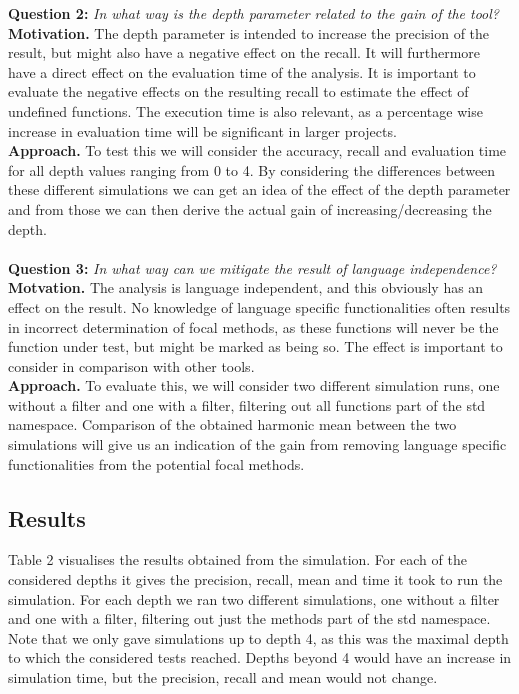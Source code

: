 \documentclass[11pt]{article}
\begin{document}
\begin{multicols}{2}
\noindent
\textbf{Question 2:} \textit{In what way is the depth parameter related to the gain of the tool?}\\
\textbf{Motivation.} The depth parameter is intended to increase the precision of the result, but might also have a negative effect on the recall. It will furthermore have a direct effect on the evaluation time of the analysis. It is important to evaluate the negative effects on the resulting recall to estimate the effect of undefined functions. The execution time is also relevant, as a percentage wise increase in evaluation time will be significant in larger projects.\\
\textbf{Approach.} To test this we will consider the accuracy, recall and evaluation time for all depth values ranging from 0 to 4. By considering the differences between these different simulations we can get an idea of the effect of the depth parameter and from those we can then derive the actual gain of increasing/decreasing the depth. \\
\\
\noindent
\textbf{Question 3:} \textit{In what way can we mitigate the result of language independence?}\\
\textbf{Motvation.} The analysis is language independent, and this obviously has an effect on the result. No knowledge of language specific functionalities often results in incorrect determination of focal methods, as these functions will never be the function under test, but might be marked as being so. The effect is important to consider in comparison with other tools. \\
\textbf{Approach.} To evaluate this, we will consider two different simulation runs, one without a filter and one with a filter, filtering out all functions part of the std namespace. Comparison of the obtained harmonic mean between the two simulations will give us an indication of the gain from removing language specific functionalities from the potential focal methods.

\subsection{Results}
Table 2 visualises the results obtained from the simulation. For each of the considered depths it gives the precision, recall, mean and time it took to run the simulation. For each depth we ran two different simulations, one without a filter and one with a filter, filtering out just the methods part of the std namespace. Note that we only gave simulations up to depth 4, as this was the maximal depth to which the considered tests reached. Depths beyond 4 would have an increase in simulation time, but the precision, recall and mean would not change.


\end{multicols}
\end{document}
